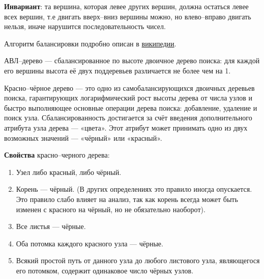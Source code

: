 \textbf{Инвариант}: та вершина, которая левее других вершин, должна остаться левее всех вершин, т.е двигать вверх--вниз вершины можно, но влево--вправо двигать нельзя, иначе нарушится последовательность чисел.

Алгоритм балансировки подробно описан в \href{https://ru.wikipedia.org/wiki/%D0%90%D0%92%D0%9B-%D0%B4%D0%B5%D1%80%D0%B5%D0%B2%D0%BE#.D0.91.D0.B0.D0.BB.D0.B0.D0.BD.D1.81.D0.B8.D1.80.D0.BE.D0.B2.D0.BA.D0.B0}{википедии}.

\textsf{АВЛ--дерево} --- сбалансированное по высоте двоичное дерево поиска: для каждой его вершины высота её двух поддеревьев различается не более чем на 1.


\textsf{Красно--чёрное дерево} --- это одно из самобалансирующихся двоичных деревьев поиска, гарантирующих логарифмический рост высоты дерева от числа узлов и быстро выполняющее основные операции дерева поиска: добавление, удаление и поиск узла. Сбалансированность достигается за счёт введения дополнительного атрибута узла дерева --- «цвета». Этот атрибут может принимать одно из двух возможных значений --- «чёрный» или «красный».

\textbf{Свойства} красно--черного дерева:
\begin{enumerate}
	\item Узел либо красный, либо чёрный.
	\item Корень --- чёрный. (В других определениях это правило иногда опускается. Это правило слабо влияет на анализ, так как корень всегда может быть изменен с красного на чёрный, но не обязательно наоборот).
	\item Все листья --- чёрные.
	\item Оба потомка каждого красного узла --- чёрные.
	\item Всякий простой путь от данного узла до любого листового узла, являющегося его потомком, содержит одинаковое число чёрных узлов.
\end{enumerate}

